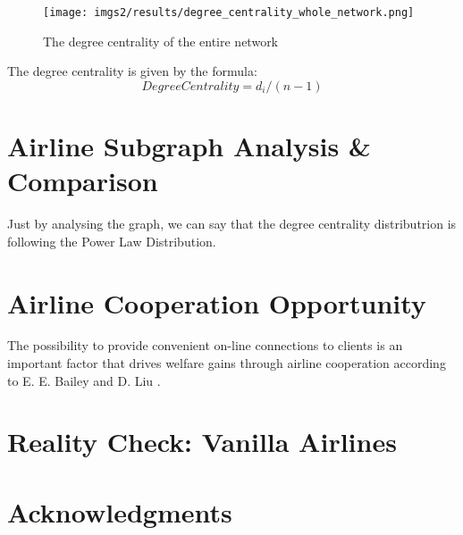 \documentclass[twocolumn]{tum-article}
\begin{document}
\begin{figure}
        \centering
        \texttt{[image: imgs2/results/degree\_centrality\_whole\_network.png]}
        \caption{
The degree centrality of the entire network}
        \label{fig:degree_centrality}
\end{figure}

The degree centrality is given by the formula:
\begin{equation}
	Degree Centrality=d_i/(n-1)
\end{equation}

\section{Airline Subgraph Analysis \& Comparison}

Just by analysing the graph, we can say that the degree centrality distributrion is following the Power Law Distribution. 

\section{Airline Cooperation Opportunity}

The possibility to provide convenient on-line connections to clients is an important factor that drives welfare gains through airline cooperation according to E. E. Bailey and D. Liu \cite{airline_consolidation_and_consumer_welfare}.

\section{Reality Check: Vanilla Airlines}


\section*{Acknowledgments}




\end{document}
